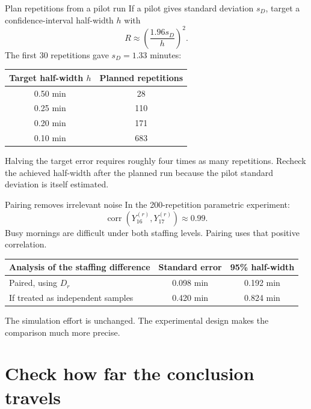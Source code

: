 \documentclass{beamer}
\begin{document}
\begin{frame}{Plan repetitions from a pilot run}
  \small
  If a pilot gives standard deviation $s_D$, target a confidence-interval half-width $h$ with
  \[
    R \approx \left(\frac{1.96s_D}{h}\right)^2.
  \]
  The first 30 repetitions gave $s_D=1.33$ minutes:

  \centering
  \begin{tabular}{@{}cc@{}}
    \toprule
    Target half-width $h$ & Planned repetitions\\
    \midrule
    0.50 min & 28\\
    0.25 min & 110\\
    0.20 min & 171\\
    0.10 min & 683\\
    \bottomrule
  \end{tabular}

  \raggedright
  \vspace{0.6em}
  Halving the target error requires roughly four times as many repetitions. Recheck the achieved half-width after the planned run because the pilot standard deviation is itself estimated.
\end{frame}

\begin{frame}{Pairing removes irrelevant noise}
  \small
  In the 200-repetition parametric experiment:
  \[
    \operatorname{corr}\!\left(Y_{16}^{(r)},Y_{17}^{(r)}\right)\approx0.99.
  \]
  Busy mornings are difficult under both staffing levels. Pairing uses that positive correlation.

  \vspace{0.6em}
  \centering
  \begin{tabular}{@{}lcc@{}}
    \toprule
    Analysis of the staffing difference & Standard error & 95\% half-width\\
    \midrule
    Paired, using $D_r$ & 0.098 min & 0.192 min\\
    If treated as independent samples & 0.420 min & 0.824 min\\
    \bottomrule
  \end{tabular}

  \raggedright
  \vspace{0.7em}
  The simulation effort is unchanged. The experimental design makes the comparison much more precise.
\end{frame}

\section{Check how far the conclusion travels}
\end{document}
